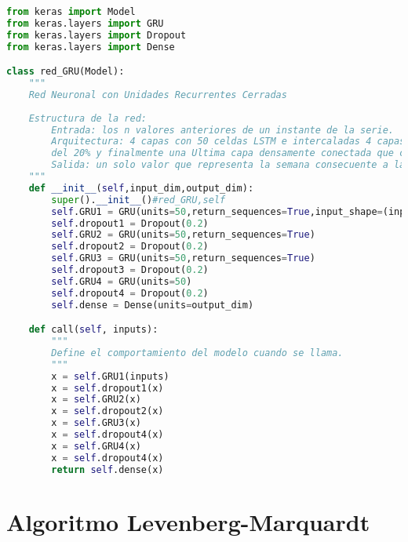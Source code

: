 \begin{lstlisting}[language=Python]
from keras import Model
from keras.layers import GRU
from keras.layers import Dropout
from keras.layers import Dense

class red_GRU(Model):
    """
    Red Neuronal con Unidades Recurrentes Cerradas
    
    Estructura de la red:
        Entrada: los n valores anteriores de un instante de la serie.
        Arquitectura: 4 capas con 50 celdas LSTM e intercaladas 4 capas de desactivaciOn (dropout)
        del 20% y finalmente una Ultima capa densamente conectada que comprende una sola neurona. 
        Salida: un solo valor que representa la semana consecuente a las n de entrada.
    """
    def __init__(self,input_dim,output_dim):
        super().__init__()#red_GRU,self
        self.GRU1 = GRU(units=50,return_sequences=True,input_shape=(input_dim, 1))
        self.dropout1 = Dropout(0.2)
        self.GRU2 = GRU(units=50,return_sequences=True)
        self.dropout2 = Dropout(0.2)
        self.GRU3 = GRU(units=50,return_sequences=True)
        self.dropout3 = Dropout(0.2)
        self.GRU4 = GRU(units=50)
        self.dropout4 = Dropout(0.2)
        self.dense = Dense(units=output_dim)

    def call(self, inputs):
        """
        Define el comportamiento del modelo cuando se llama.
        """
        x = self.GRU1(inputs)
        x = self.dropout1(x)
        x = self.GRU2(x)
        x = self.dropout2(x)
        x = self.GRU3(x)
        x = self.dropout4(x)
        x = self.GRU4(x)
        x = self.dropout4(x)
        return self.dense(x)
\end{lstlisting}

\section{Algoritmo Levenberg-Marquardt}

